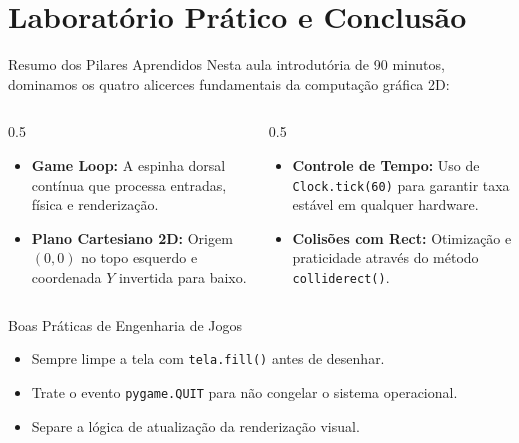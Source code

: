 \section{Laboratório Prático e Conclusão}

\begin{frame}{Resumo dos Pilares Aprendidos}
    Nesta aula introdutória de 90 minutos, dominamos os quatro alicerces fundamentais da computação gráfica 2D:

    \vspace{0.3cm}
    \begin{columns}
        \begin{column}{0.5\textwidth}
            \begin{itemize}
                \item \textbf{Game Loop:} A espinha dorsal contínua que processa entradas, física e renderização.
                \item \textbf{Plano Cartesiano 2D:} Origem $(0, 0)$ no topo esquerdo e coordenada $Y$ invertida para baixo.
            \end{itemize}
        \end{column}
        \begin{column}{0.5\textwidth}
            \begin{itemize}
                \item \textbf{Controle de Tempo:} Uso de \texttt{Clock.tick(60)} para garantir taxa estável em qualquer hardware.
                \item \textbf{Colisões com Rect:} Otimização e praticidade através do método \texttt{colliderect()}.
            \end{itemize}
        \end{column}
    \end{columns}

    \vspace{0.4cm}
    \begin{block}{Boas Práticas de Engenharia de Jogos}
        \begin{itemize}
            \item Sempre limpe a tela com \texttt{tela.fill()} antes de desenhar.
            \item Trate o evento \texttt{pygame.QUIT} para não congelar o sistema operacional.
            \item Separe a lógica de atualização da renderização visual.
        \end{itemize}
    \end{block}
\end{frame}

